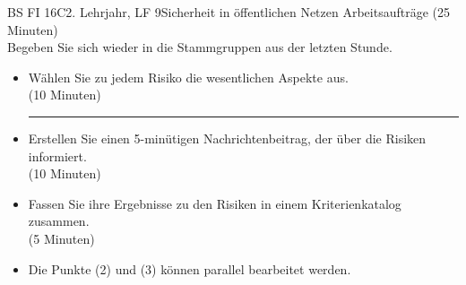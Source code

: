 \documentclass[oneside,openany,headings=optiontotoc,11pt,numbers=noenddot]{scrreprt}
\begin{document}
\begin{worksheet}{BS FI 16C}{2. Lehrjahr, LF 9}{Sicherheit in öffentlichen Netzen}
		\color{codegray}Arbeitsaufträge (25 Minuten)\\
		\color{black}
		Begeben Sie sich wieder in die Stammgruppen aus der letzten Stunde.
		\begin{itemize}
			\item[(1)] Wählen Sie zu jedem Risiko die wesentlichen Aspekte aus.\\ (10 Minuten)\\
			\hrule
			\item[(2)]Erstellen Sie einen 5-minütigen Nachrichtenbeitrag, der über die Risiken informiert.\\(10 Minuten)
			\item[(3)] Fassen Sie ihre Ergebnisse zu den Risiken in einem Kriterienkatalog zusammen.\\ (5 Minuten)
			\item[] \tiny Die Punkte (2) und (3) können parallel bearbeitet werden.
		\end{itemize}
	\end{worksheet}
\end{document}
